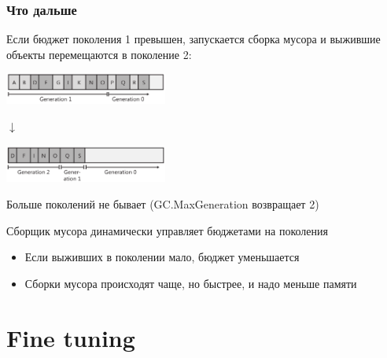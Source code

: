 \documentclass[xetex,mathserif,serif]{beamer}
\begin{document}
	\begin{frame}
		\frametitle{Что дальше}
		Если бюджет поколения 1 превышен, запускается сборка мусора и выжившие объекты перемещаются в поколение 2:
		\begin{center}
			\includegraphics[width=0.4\textwidth]{generation1full.png}
		\end{center}
		
		\vspace{-7mm}
		
		\begin{center}\begin{LARGE}$\downarrow$\end{LARGE}\end{center}
	
		\vspace{-7mm}
	
		\begin{center}
			\includegraphics[width=0.4\textwidth]{generation2.png}
		\end{center}
		Больше поколений не бывает (GC.MaxGeneration возвращает 2)

		Сборщик мусора динамически управляет бюджетами на поколения
		\begin{itemize}
			\item Если выживших в поколении мало, бюджет уменьшается
			\item Сборки мусора происходят чаще, но быстрее, и надо меньше памяти
		\end{itemize}
	\end{frame}

	\section{Fine tuning}
\end{document}

